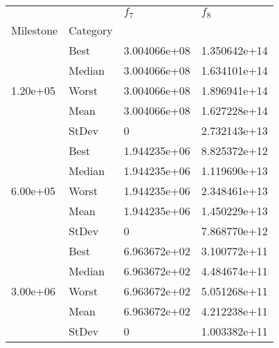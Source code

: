 \begin{tabular}{llll}
\toprule
         &      &      $f_{7}$ &      $f_{8}$ \\
Milestone & Category &              &              \\
\midrule
\multirow{5}{*}{1.20e+05} & Best & 3.004066e+08 & 1.350642e+14 \\
         & Median & 3.004066e+08 & 1.634101e+14 \\
         & Worst & 3.004066e+08 & 1.896941e+14 \\
         & Mean & 3.004066e+08 & 1.627228e+14 \\
         & StDev &            0 & 2.732143e+13 \\
\cline{1-4}
\multirow{5}{*}{6.00e+05} & Best & 1.944235e+06 & 8.825372e+12 \\
         & Median & 1.944235e+06 & 1.119690e+13 \\
         & Worst & 1.944235e+06 & 2.348461e+13 \\
         & Mean & 1.944235e+06 & 1.450229e+13 \\
         & StDev &            0 & 7.868770e+12 \\
\cline{1-4}
\multirow{5}{*}{3.00e+06} & Best & 6.963672e+02 & 3.100772e+11 \\
         & Median & 6.963672e+02 & 4.484674e+11 \\
         & Worst & 6.963672e+02 & 5.051268e+11 \\
         & Mean & 6.963672e+02 & 4.212238e+11 \\
         & StDev &            0 & 1.003382e+11 \\
\bottomrule
\end{tabular}
